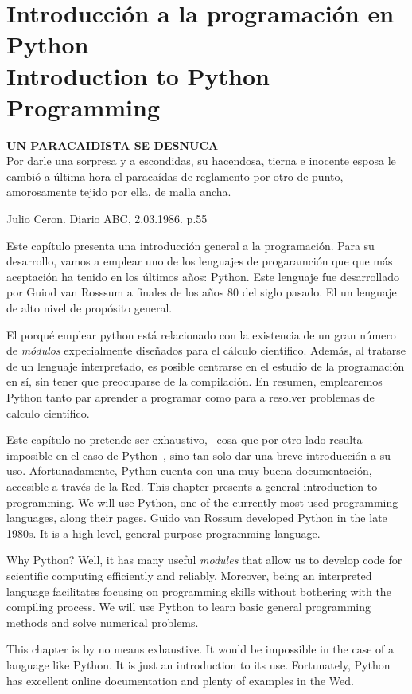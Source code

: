 \chapter[Intro a Python \textsection \textsection \ Intro to python]{Introducción a la programación en Python\\ Introduction to Python Programming}  
\epigraph{\textbf{UN PARACAIDISTA SE DESNUCA}\\ Por darle una sorpresa y a escondidas, su hacendosa, tierna e inocente esposa le cambió a última hora el paracaídas de reglamento por otro de punto, amorosamente tejido por ella, de malla ancha.}{Julio Ceron. Diario ABC, 2.03.1986. p.55}
\begin{paracol}{2}
Este capítulo presenta una introducción general a la programación. Para su desarrollo, vamos a emplear uno de los lenguajes de progaramción que  que más aceptación ha tenido en los últimos años: Python. Este lenguaje fue desarrollado por Guiod van Rosssum a finales de los años 80 del siglo pasado. El un lenguaje de alto nivel de propósito general.

El porqué emplear python está relacionado con la existencia de un gran número de \emph{módulos} expecialmente diseñados para el cálculo científico. Además, al tratarse de un lenguaje interpretado, es posible centrarse en el estudio de la programación en sí, sin tener que preocuparse de la compilación. En resumen, emplearemos Python tanto par aprender a programar como para a resolver problemas de calculo científico.

Este capítulo no pretende ser exhaustivo, --cosa que por otro lado resulta imposible en el caso de Python--, sino tan solo dar una breve introducción a su uso. Afortunadamente, Python cuenta con una muy buena documentación, accesible a través de la Red. 
\switchcolumn 
This chapter presents a general introduction to programming. We will use Python, one of the currently most used programming languages, along their pages. Guido van Rossum developed Python in the late 1980s. It is a high-level, general-purpose programming language. 

Why Python? Well, it has many useful \emph{modules} that allow us to develop code for scientific computing efficiently and reliably. Moreover, being an interpreted language facilitates focusing on programming skills without bothering with the compiling process. We will use Python to learn basic general programming methods and solve numerical problems.

This chapter is by no means exhaustive. It would be impossible in the case of a language like Python. It is just an introduction to its use. Fortunately, Python has excellent online documentation and plenty of examples in the Wed. 
\end{paracol}


